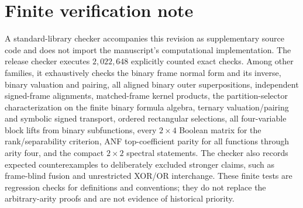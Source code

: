 \documentclass[11pt]{article}
\theoremstyle{definition}
\theoremstyle{remark}
\begin{document}
\section{Finite verification note}
A standard-library checker accompanies this revision as supplementary source code and does not import the manuscript's computational implementation.  The release checker executes $2{,}022{,}648$ explicitly counted exact checks.  Among other families, it exhaustively checks the binary frame normal form and its inverse, binary valuation and pairing, all aligned binary outer superpositions, independent signed-frame alignments, matched-frame kernel products, the partition-selector characterization on the finite binary formula algebra, ternary valuation/pairing and symbolic signed transport, ordered rectangular selections, all four-variable block lifts from binary subfunctions, every $2\times4$ Boolean matrix for the rank/separability criterion, ANF top-coefficient parity for all functions through arity four, and the compact $2\times2$ spectral statements.  The checker also records expected counterexamples to deliberately excluded stronger claims, such as frame-blind fusion and unrestricted XOR/OR interchange.  These finite tests are regression checks for definitions and conventions; they do not replace the arbitrary-arity proofs and are not evidence of historical priority.
\end{document}

